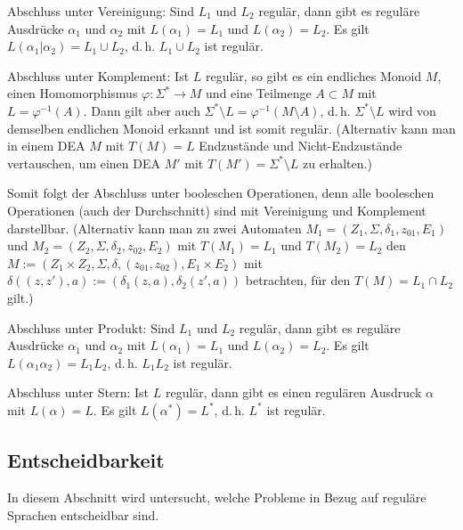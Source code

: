 \begin{Beweis}
    Abschluss unter Vereinigung:
    Sind $L_1$ und $L_2$ regulär,
    dann gibt es reguläre Ausdrücke $\alpha_1$ und $\alpha_2$ mit
    $L(\alpha_1) = L_1$ und $L(\alpha_2) = L_2$.
    Es gilt $L(\alpha_1 | \alpha_2) = L_1 \cup L_2$, d.\,h.
    $L_1 \cup L_2$ ist regulär.
    
    Abschluss unter Komplement:
    Ist $L$ regulär, so gibt es ein endliches Monoid $M$, einen
    Homomorphismus $\varphi\colon \Sigma^\ast \rightarrow M$
    und eine Teilmenge $A \subset M$ mit $L = \varphi^{-1}(A)$.
    Dann gilt aber auch
    $\Sigma^\ast \setminus L = \varphi^{-1}(M \setminus A)$,
    d.\,h. $\Sigma^\ast \setminus L$ wird von demselben endlichen Monoid
    erkannt und ist somit regulär.
    (Alternativ kann man in einem DEA $M$ mit $T(M) = L$ Endzustände und
    Nicht-Endzustände vertauschen, um einen DEA $M'$ mit
    $T(M') = \Sigma^\ast \setminus L$ zu erhalten.)
    
    Somit folgt der Abschluss unter booleschen Operationen,
    denn alle booleschen Operationen (auch der Durchschnitt) sind mit
    Vereinigung und Komplement darstellbar.
    (Alternativ kann man zu zwei Automaten
    $M_1 = (Z_1, \Sigma, \delta_1, z_{01}, E_1)$ und
    $M_2 = (Z_2, \Sigma, \delta_2, z_{02}, E_2)$ mit
    $T(M_1) = L_1$ und $T(M_2) = L_2$ den 
    $M := (Z_1 \times Z_2, \Sigma, \delta, (z_{01}, z_{02}), E_1 \times E_2)$
    mit $\delta((z, z'), a) := (\delta_1(z, a), \delta_2(z', a))$
    betrachten, für den $T(M) = L_1 \cap L_2$ gilt.)
    
    Abschluss unter Produkt:
    Sind $L_1$ und $L_2$ regulär,
    dann gibt es reguläre Ausdrücke $\alpha_1$ und $\alpha_2$ mit
    $L(\alpha_1) = L_1$ und $L(\alpha_2) = L_2$.
    Es gilt $L(\alpha_1 \alpha_2) = L_1 L_2$, d.\,h.
    $L_1 L_2$ ist regulär.
    
    Abschluss unter Stern:
    Ist $L$ regulär, dann gibt es einen regulären Ausdruck $\alpha$ mit
    $L(\alpha) = L$.
    Es gilt $L(\alpha^\ast) = L^\ast$, d.\,h. $L^\ast$ ist regulär.
\end{Beweis}

\pagebreak

\subsection{%
    Entscheidbarkeit%
}

\begin{Bem}
    In diesem Abschnitt wird untersucht, welche Probleme in Bezug auf
    reguläre Sprachen entscheidbar sind.
\end{Bem}

